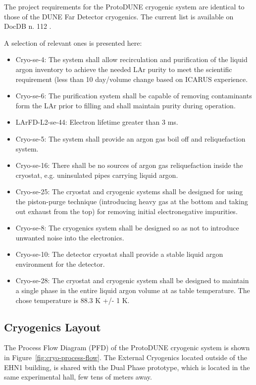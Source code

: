 
The project requirements for the ProtoDUNE cryogenic system are identical to those of the DUNE Far Detector cryogenics. The current list is available on DocDB n. 112 .

A selection of relevant ones is presented here:

\begin{itemize}
\item Cryo-se-4: The system shall allow recirculation and purification of the liquid argon inventory to achieve the needed LAr purity to meet the scientific requirement (less than 10 day/volume change based on ICARUS experience.
\item  Cryo-se-6: The purification system shall be capable of removing contaminants form the LAr prior to filling and shall maintain purity during operation.
\item  LArFD-L2-se-44: Electron lifetime greater than 3 ms.
\item  Cryo-se-5: The system shall provide an argon gas boil off and reliquefaction system.
\item  Cryo-se-16: There shall be no sources of argon gas reliquefaction inside the cryostat, e.g. uninsulated pipes carrying liquid argon.
\item  Cryo-se-25: The cryostat and cryogenic systems shall be designed for using the piston-purge technique (introducing heavy gas at the bottom and taking out exhaust from the top) for removing initial electronegative impurities.
\item  Cryo-se-8: The cryogenics system shall be designed so as not to introduce unwanted noise into the electronics.
\item  Cryo-se-10: The detector cryostat shall provide a stable liquid argon environment for the detector.
\item  Cryo-se-28: The cryostat and cryogenic system shall be designed to maintain a single phase in the entire liquid argon volume at as table temperature. The chose temperature is 88.3 K +/- 1 K.
\end{itemize}


\subsection{Cryogenics Layout}

The Process Flow Diagram (PFD) of the ProtoDUNE cryogenic system is shown in Figure~\ref{fig:cryo-process-flow}. The External Cryogenics located outside of the EHN1 building, is shared with the Dual Phase prototype, which is located in the same experimental hall, few tens of meters away.


